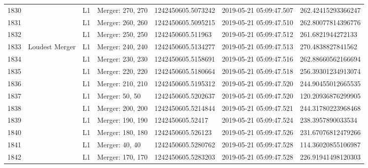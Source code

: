 \begin{longtable}{lllllll}
1830 &                                                    &       L1 &  Merger: 270, 270 &  1242450605.5073242 &  2019-05-21 05:09:47.507 &  262.42415293366247 \\
1831 &                                                    &       L1 &  Merger: 260, 260 &  1242450605.5095215 &  2019-05-21 05:09:47.510 &  262.80077814396776 \\
1832 &                                                    &       L1 &  Merger: 250, 250 &   1242450605.511963 &  2019-05-21 05:09:47.512 &   261.6821944272133 \\
1833 &                                     Loudest Merger &       L1 &  Merger: 240, 240 &  1242450605.5134277 &  2019-05-21 05:09:47.513 &   270.4838827841562 \\
1834 &                                                    &       L1 &  Merger: 230, 230 &  1242450605.5158691 &  2019-05-21 05:09:47.516 &  262.88660562166694 \\
1835 &                                                    &       L1 &  Merger: 220, 220 &  1242450605.5180664 &  2019-05-21 05:09:47.518 &  256.39301234913074 \\
1836 &                                                    &       L1 &  Merger: 210, 210 &  1242450605.5195312 &  2019-05-21 05:09:47.520 &  244.90455012665535 \\
1837 &                                                    &       L1 &    Merger: 50, 50 &  1242450605.5202637 &  2019-05-21 05:09:47.520 &  120.20936876299905 \\
1838 &                                                    &       L1 &  Merger: 200, 200 &  1242450605.5214844 &  2019-05-21 05:09:47.521 &  244.31780223968468 \\
1839 &                                                    &       L1 &  Merger: 190, 190 &    1242450605.52417 &  2019-05-21 05:09:47.524 &   238.3957890033534 \\
1840 &                                                    &       L1 &  Merger: 180, 180 &   1242450605.526123 &  2019-05-21 05:09:47.526 &  231.67076812479266 \\
1841 &                                                    &       L1 &    Merger: 40, 40 &  1242450605.5280762 &  2019-05-21 05:09:47.528 &  114.36020855106987 \\
1842 &                                                    &       L1 &  Merger: 170, 170 &  1242450605.5283203 &  2019-05-21 05:09:47.528 &  226.91941498120303 \\

\end{longtable}
